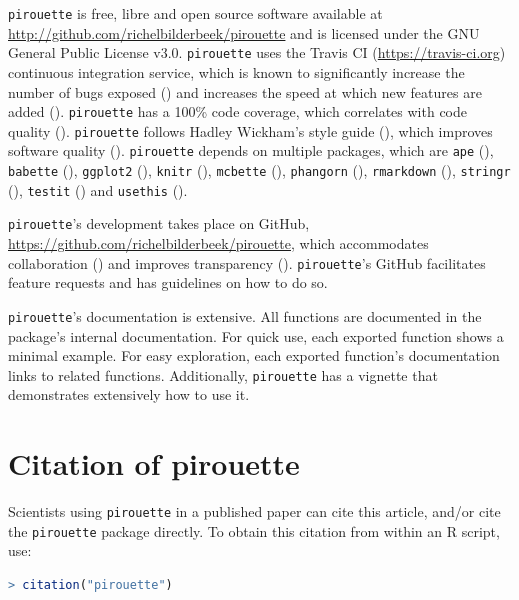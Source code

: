\documentclass{article}
\begin{document}
\verb;pirouette; is free, libre and open source software available at 
\url{http://github.com/richelbilderbeek/pirouette}
and is licensed under the GNU General Public License v3.0.
\verb;pirouette; uses the Travis CI (\url{https://travis-ci.org})
continuous integration service, which is known to significantly 
increase the number of bugs exposed (\cite{vasilescu2015}) and increases
the speed at which new features are added (\cite{vasilescu2015}).
\verb;pirouette; has a 100\% code coverage, which correlates with 
code quality (\cite{horgan1994,del1995correlation}). 
\verb;pirouette; follows Hadley Wickham's style guide (\cite{style_guide}), 
which improves software quality (\cite{fang2001}).
\verb;pirouette; depends on multiple packages, which are 
\verb;ape; (\cite{APE}), 
\verb;babette; (\cite{bilderbeek2018babette}),
\verb;ggplot2; (\cite{ggplot2}),
\verb;knitr; (\cite{knitr}),
\verb;mcbette; (\cite{mcbette}),
\verb;phangorn; (\cite{phangorn}),
\verb;rmarkdown; (\cite{rmarkdown}),
\verb;stringr; (\cite{stringr}),
\verb;testit; (\cite{testit}) and 
\verb;usethis; (\cite{usethis}).

\verb;pirouette;'s development takes place on GitHub,
\url{https://github.com/richelbilderbeek/pirouette}, 
which accommodates collaboration (\cite{perez2016ten}) 
and improves transparency (\cite{gorgolewski2016practical}).
\verb;pirouette;'s GitHub facilitates feature requests and 
has guidelines on how to do so.

\verb;pirouette;'s documentation is extensive. All functions are documented
in the package's internal documentation. For quick use, 
each exported function shows a minimal example. 
For easy exploration, each exported function's documentation links to related functions.
Additionally, \verb;pirouette; has a vignette that demonstrates extensively how
to use it. 

\section{Citation of pirouette}

Scientists using \verb;pirouette; in a published paper can cite this
article, and/or cite the \verb;pirouette; package 
directly. To obtain this citation from within an R script, use:

\begin{lstlisting}[language=R]
> citation("pirouette")
\end{lstlisting}
\end{document}
